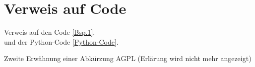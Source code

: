 \section{Verweis auf Code}
Verweis auf den Code \autoref{Bsp.1}.\\
und der Python-Code \autoref{Python-Code}.

Zweite Erwähnung einer Abkürzung \ac{AGPL} (Erlärung wird nicht mehr angezeigt)